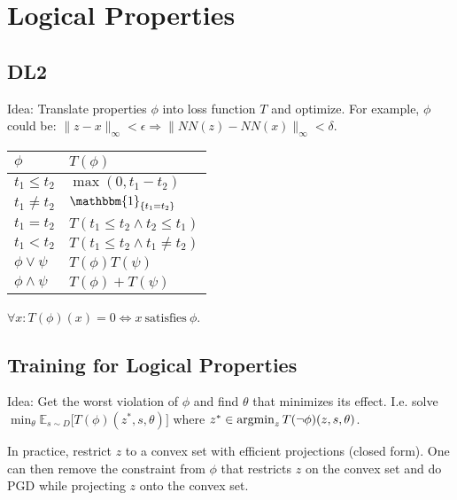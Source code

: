\section{Logical Properties}
\subsection*{DL2}
Idea: Translate properties $\phi$ into loss function $T$ and optimize.
For example, $\phi$ could be: $\|z-x\|_{\infty}<\epsilon \Rightarrow \|NN(z)-NN(x)\|_{\infty}<\delta$.


\vspace*{1mm}
\renewcommand{\arraystretch}{1.1}
\begin{tabular}{ll}
    \hline
    $\phi $           & $T(\phi)$                            \\
    \hline
    $t_1 \leq t_2$    & $\max(0, t_1 - t_2)$                 \\
    $t_1 \neq t_2$    & $\mathbbm{1}_{\{t_1 = t_2\}}$        \\
    $t_1 = t_2$       & $T(t_1 \leq t_2 \land t_2 \leq t_1)$ \\
    $t_1 < t_2$       & $T(t_1 \leq t_2 \land t_1 \neq t_2)$ \\
    $\phi \lor \psi$  & $T(\phi) T(\psi)$                    \\
    $\phi \land \psi$ & $T(\phi) + T(\psi)$                  \\
    \hline
\end{tabular}
\vspace*{1mm}

$\forall x: T(\phi)(x) = 0 \Leftrightarrow x\ \text{satisfies}\ \phi$.

\subsection*{Training for Logical Properties}
Idea: Get the worst violation of $\phi$ and find $\theta$ that minimizes its effect. I.e. solve {$\min_\theta\mathbb{E}_{s \sim D} \big[ T(\phi)(z^*, s, \theta) \big]$} where {$z^* \in \operatorname{\operatorname{argmin}}_z T(\lnot \phi)(z, s, \theta)$}.

In practice, restrict $z$ to a convex set with efficient projections (closed form). One can then remove the constraint from $\phi$ that restricts $z$ on the convex set and do PGD while projecting $z$ onto the convex set.
